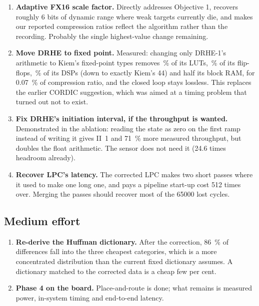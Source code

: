\documentclass[11pt,a4paper]{article}
\begin{document}
\begin{enumerate}
\item \textbf{Adaptive FX16 scale factor.} Directly addresses Objective 1,
recovers roughly 6 bits of dynamic range where weak targets currently die, and
makes our reported compression ratios reflect the algorithm rather than the
recording. Probably the single highest-value change remaining.

\item \textbf{Move DRHE to fixed point.} Measured: changing only DRHE-1's
arithmetic to Kiem's fixed-point types removes \,\% of its
LUTs, \,\% of its flip-flops, \,\% of its DSPs
(down to exactly Kiem's 44) and half its block RAM, for \SI{0.07}{\percent} of
compression ratio, and the closed loop stays lossless. This replaces the
earlier CORDIC suggestion, which was aimed at a timing problem that turned out
not to exist.

\item \textbf{Fix DRHE's initiation interval, if the throughput is wanted.}
Demonstrated in the ablation: reading the state as zero on the first ramp
instead of writing it gives II~1 and \SI{71}{\percent} more measured
throughput, but doubles the float arithmetic. The sensor does not need it
(24.6 times headroom already).

\item \textbf{Recover LPC's latency.} The corrected LPC makes two short passes
where it used to make one long one, and pays a pipeline start-up cost
\num{512} times over. Merging the passes should recover most of the
\num{65000} lost cycles.
\end{enumerate}

\subsection{Medium effort}

\begin{enumerate}[resume]
\item \textbf{Re-derive the Huffman dictionary.} After the correction,
\SI{86}{\percent} of differences fall into the three cheapest categories, which
is a more concentrated distribution than the current fixed dictionary assumes.
A dictionary matched to the corrected data is a cheap few per cent.

\item \textbf{Phase 4 on the board.} Place-and-route is done; what remains is
measured power, in-system timing and end-to-end latency.
\end{enumerate}
\end{document}
